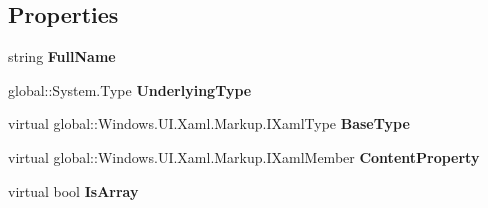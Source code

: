 \subsection*{Properties}
\begin{DoxyCompactItemize}
\item 
\mbox{\label{class_r_f_storage_1_1_r_f_storage___xaml_type_info_1_1_xaml_system_base_type_a5bd25aef0eb46bff08d4e9b055096d07}} 
string {\bfseries Full\+Name}
\item 
\mbox{\label{class_r_f_storage_1_1_r_f_storage___xaml_type_info_1_1_xaml_system_base_type_a1ed74ccb2e92e9d987be98cc7b530fb7}} 
global\+::\+System.\+Type {\bfseries Underlying\+Type}
\item 
\mbox{\label{class_r_f_storage_1_1_r_f_storage___xaml_type_info_1_1_xaml_system_base_type_a9a5eca8479ca8b2bc5e4e9921ba13409}} 
virtual global\+::\+Windows.\+U\+I.\+Xaml.\+Markup.\+I\+Xaml\+Type {\bfseries Base\+Type}
\item 
\mbox{\label{class_r_f_storage_1_1_r_f_storage___xaml_type_info_1_1_xaml_system_base_type_aae652bb356a5ec46d83539c214ee98c0}} 
virtual global\+::\+Windows.\+U\+I.\+Xaml.\+Markup.\+I\+Xaml\+Member {\bfseries Content\+Property}
\item 
\mbox{\label{class_r_f_storage_1_1_r_f_storage___xaml_type_info_1_1_xaml_system_base_type_a8e2f2300d6fbb5a1be685ad08a89dee6}} 
virtual bool {\bfseries Is\+Array}
\item 
\mbox{\label{class_r_f_storage_1_1_r_f_storage___xaml_type_info_1_1_xaml_system_base_type_a991f4693d7c683a1a92606290b29f128}} 

\end{DoxyCompactItemize}
